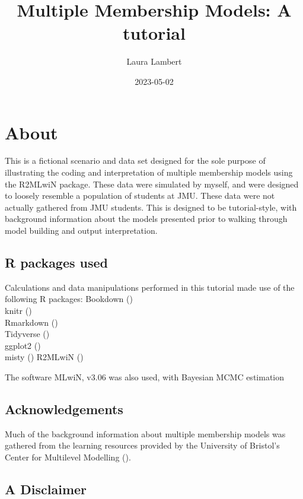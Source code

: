\documentclass[
]{book}
\title{Multiple Membership Models: A tutorial}
\author{Laura Lambert}
\date{2023-05-02}
\begin{document}
\maketitle

{
\setcounter{tocdepth}{1}
\tableofcontents
}
\hypertarget{about}{%
\chapter{About}\label{about}}

This is a fictional scenario and data set designed for the sole purpose of illustrating the coding and interpretation of multiple membership models using the R2MLwiN package. These data were simulated by myself, and were designed to loosely resemble a population of students at JMU. These data were not actually gathered from JMU students. This is designed to be tutorial-style, with background information about the models presented prior to walking through model building and output interpretation.

\hypertarget{r-packages-used}{%
\section{R packages used}\label{r-packages-used}}

Calculations and data manipulations performed in this tutorial made use of the following R packages:
Bookdown (\citet{R-bookdown})\\
knitr (\citet{R-knitr})\\
Rmarkdown (\citet{R-rmarkdown})\\
Tidyverse (\citet{R-tidyverse})\\
ggplot2 (\citet{R-ggplot2})\\
misty (\citet{R-misty})
R2MLwiN (\citet{R-R2MLwiN})

The software MLwiN, v3.06 \citep{MLwiN} was also used, with Bayesian MCMC estimation \citep{MCMC2022}

\hypertarget{acknowledgements}{%
\section{Acknowledgements}\label{acknowledgements}}

Much of the background information about multiple membership models was gathered from the learning resources provided by the University of Bristol's Center for Multilevel Modelling (\citet{LEMMA}).

\hypertarget{a-disclaimer}{%
\section{A Disclaimer}\label{a-disclaimer}}
\end{document}
